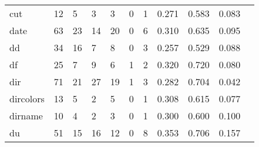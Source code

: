 \begin{longtable}{lp{1.10cm}p{1.10cm}p{1.10cm}p{1.10cm}p{1.10cm}p{1.10cm}p{1.10cm}p{1.10cm}p{1.10cm}p{1.10cm}}
cut       &                     12 &                                  5 &                                 3 &                                3 &                                 0 &                               1 &                          0.271 &                                 0.583 &                               0.083 \\
date      &                     63 &                                 23 &                                14 &                               20 &                                 0 &                               6 &                          0.310 &                                 0.635 &                               0.095 \\
dd        &                     34 &                                 16 &                                 7 &                                8 &                                 0 &                               3 &                          0.257 &                                 0.529 &                               0.088 \\
df        &                     25 &                                  7 &                                 9 &                                6 &                                 1 &                               2 &                          0.320 &                                 0.720 &                               0.080 \\
dir       &                     71 &                                 21 &                                27 &                               19 &                                 1 &                               3 &                          0.282 &                                 0.704 &                               0.042 \\
dircolors &                     13 &                                  5 &                                 2 &                                5 &                                 0 &                               1 &                          0.308 &                                 0.615 &                               0.077 \\
dirname   &                     10 &                                  4 &                                 2 &                                3 &                                 0 &                               1 &                          0.300 &                                 0.600 &                               0.100 \\
du        &                     51 &                                 15 &                                16 &                               12 &                                 0 &                               8 &                          0.353 &                                 0.706 &                               0.157 \\

\end{longtable}
